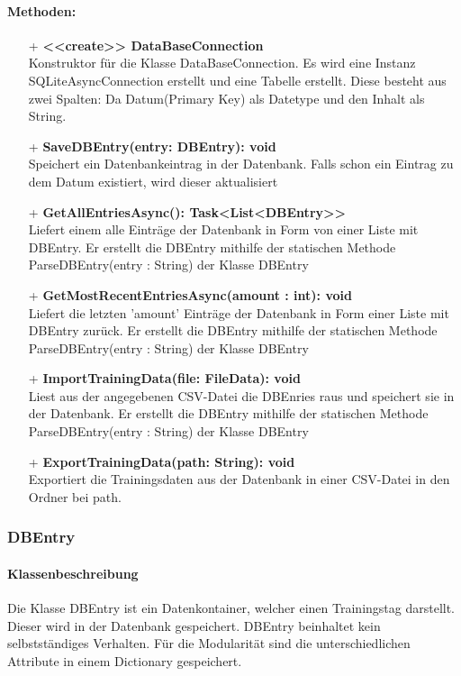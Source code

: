 \documentclass[a4paper,12pt]{article}
\begin{document}
	\paragraph{Methoden:}
	\begin{itemize}
		\item[+] \textbf{<<create>> DataBaseConnection}\\Konstruktor für die Klasse DataBaseConnection. Es wird eine Instanz SQLiteAsyncConnection erstellt und eine Tabelle erstellt. Diese besteht aus zwei Spalten: Da Datum(Primary Key) als Datetype und den Inhalt als String.
		\item[+] \textbf{SaveDBEntry(entry: DBEntry): void}\\Speichert ein Datenbankeintrag in der \gls{Datenbank}. Falls schon ein Eintrag zu dem Datum existiert, wird dieser aktualisiert\\
		\item[+] \textbf{GetAllEntriesAsync(): Task<List<DBEntry>>}\\Liefert einem alle Einträge der Datenbank in Form von einer Liste mit DBEntry. Er erstellt die DBEntry mithilfe der statischen Methode ParseDBEntry(entry : String) der Klasse DBEntry\\ 
		\item[+] \textbf{GetMostRecentEntriesAsync(amount : int): void}\\Liefert  die letzten 'amount' Einträge der Datenbank in Form einer Liste mit DBEntry zurück. Er erstellt die DBEntry mithilfe der statischen Methode ParseDBEntry(entry : String) der Klasse DBEntry\\
		\item[+] \textbf{ImportTrainingData(file: FileData): void}\\Liest aus der angegebenen \gls{CSV}-Datei die DBEnries raus und speichert sie in der \gls{Datenbank}. Er erstellt die DBEntry mithilfe der statischen Methode ParseDBEntry(entry : String) der Klasse DBEntry\\
		\item[+] \textbf{ExportTrainingData(path: String): void}\\Exportiert die Trainingsdaten aus der \gls{Datenbank} in einer \gls{CSV}-Datei in den Ordner bei path. \\
	\end{itemize}
\subsubsection{DBEntry}
	\paragraph{Klassenbeschreibung}
	Die Klasse DBEntry ist ein Datenkontainer, welcher einen Trainingstag darstellt. Dieser wird in der Datenbank gespeichert. DBEntry beinhaltet kein selbstständiges Verhalten. Für die Modularität sind die unterschiedlichen Attribute in einem Dictionary gespeichert.
	
\end{document}
